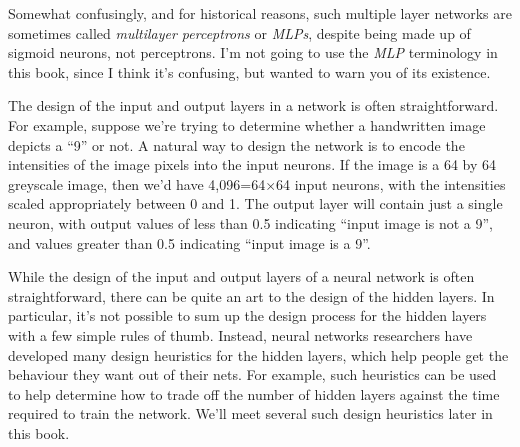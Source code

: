 \begin{marginfigure}[-35mm]
\begin{neuralnetwork}[height=7.5, layertitleheight=0, nodespacing=1cm, layerspacing=1.5cm]
	\newcommand{\nodetextclear}[2]{}
	\newcommand{\nodetextxnb}[2]{\ifnum0=#2 \else $x_#2$ \fi}
	\newcommand{\logiclabel}[1]{\,{$\scriptstyle#1$}\,}
	\newcommand{\nodetextY}[2]{$y$}
	\newcommand{\linklabelsU}[4]{\logiclabel{+1}}
	\newcommand{\linklabelsA}[4]{\ifnum0=#2 \logiclabel{+3} \else \logiclabel{-2} \fi}
	\setdefaultnodetext{\nodetextclear}
	\inputlayer[count=3, bias=false,  title=Input\\layer, text=\nodetextxnb]
	\hiddenlayer[count=6, bias=false, title=Hidden\\layer, ]\linklayers
	\hiddenlayer[count=4, bias=false, title=Hidden\\layer, ]\linklayers
	\outputlayer[count=1, text=\nodetextY, title=Output\\layer, ]\linklayers
\end{neuralnetwork}
\end{marginfigure}



Somewhat confusingly, and for historical reasons, such multiple layer networks are sometimes called \textit{multilayer perceptrons} or \textit{MLPs}, despite being made up of sigmoid neurons, not perceptrons. I'm not going to use the \textit{MLP} terminology in this book, since I think it's confusing, but wanted to warn you of its existence.

The design of the input and output layers in a network is often straightforward. For example, suppose we're trying to determine whether a handwritten image depicts a ``9'' or not. A natural way to design the network is to encode the intensities of the image pixels into the input neurons. If the image is a 64 by 64 greyscale image, then we'd have 4,096=64$\times$64 input neurons, with the intensities scaled appropriately between 0 and 1. The output layer will contain just a single neuron, with output values of less than 0.5 indicating ``input image is not a 9'', and values greater than 0.5 indicating ``input image is a 9''.

While the design of the input and output layers of a neural network is often straightforward, there can be quite an art to the design of the hidden layers. In particular, it's not possible to sum up the design process for the hidden layers with a few simple rules of thumb. Instead, neural networks researchers have developed many design heuristics for the hidden layers, which help people get the behaviour they want out of their nets. For example, such heuristics can be used to help determine how to trade off the number of hidden layers against the time required to train the network. We'll meet several such design heuristics later in this book. 

